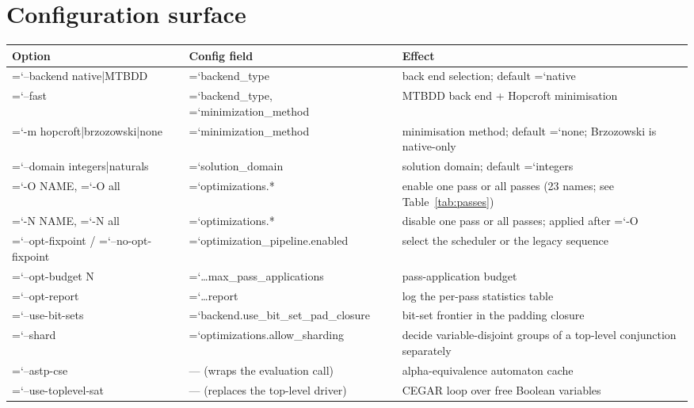 \documentclass[10pt,a4paper]{article}
\newcommand{\code}[1]{{\small\ttfamily\hyphenchar\font=`\-\relax #1}}
\begin{document}
\section{Configuration surface}
\label{sec:config}

\begin{center}
\footnotesize
\begin{tabular}{p{34mm}p{44mm}p{66mm}}
\toprule
Option & Config field & Effect \\
\midrule
\code{--backend native|\allowbreak MTBDD} & \code{backend\_type} & back end selection; default \code{native} \\
\code{--fast} & \code{backend\_type}, \code{minimization\_method} & MTBDD back end + Hopcroft minimisation \\
\code{-m hopcroft|\allowbreak brzozowski|\allowbreak none} & \code{minimization\_method} & minimisation method; default \code{none}; Brzozowski is native-only \\
\code{--domain integers|\allowbreak naturals} & \code{solution\_domain} & solution domain; default \code{integers} \\
\code{-O NAME}, \code{-O all} & \code{optimizations.*} & enable one pass or all passes (23 names; see Table~\ref{tab:passes}) \\
\code{-N NAME}, \code{-N all} & \code{optimizations.*} & disable one pass or all passes; applied after \code{-O} \\
\code{--opt-fixpoint} /\allowbreak{} \code{--no-opt-fixpoint} & \code{optimization\_pipeline.\allowbreak enabled} & select the scheduler or the legacy sequence \\
\code{--opt-budget N} & \code{\dots max\_pass\_applications} & pass-application budget \\
\code{--opt-report} & \code{\dots report} & log the per-pass statistics table \\
\code{--use-bit-sets} & \code{backend.\allowbreak use\_\allowbreak bit\_\allowbreak set\_\allowbreak pad\_\allowbreak closure} & bit-set frontier in the padding closure \\
\code{--shard} & \code{optimizations.\allowbreak allow\_sharding} & decide variable-disjoint groups of a top-level conjunction separately \\
\code{--astp-cse} & --- (wraps the evaluation call) & alpha-equivalence automaton cache \\
\code{--use-toplevel-sat} & --- (replaces the top-level driver) & CEGAR loop over free Boolean variables \\

\end{tabular}
\end{center}
\end{document}

